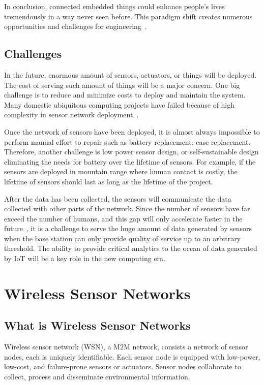 In conclusion, connected embedded things could enhance people's lives
tremendously in a way never seen before. This paradigm shift creates numerous
opportunities and challenges for engineering~\cite{Chen2012}.

\subsection{Challenges}

In the future, enormous amount of sensors, actuators, or things will be
deployed. The cost of serving such amount of things will be a major concern. One
big challenge is to reduce and minimize costs to deploy and maintain the system.
Many domestic ubiquitous computing projects have failed because of high
complexity in sensor network deployment~\cite{Beckmann2004}.

Once the network of sensors have been deployed, it is almost always impossible to
perform manual effort to repair such as battery replacement, case
replacement. Therefore, another challenge is low power sensor design, or
self-sustainable design eliminating the needs for battery over the lifetime of
sensors. For example, if the sensors are deployed in mountain range where human
contact is costly, the lifetime of sensors should last as long as the lifetime
of the project.

After the data has been collected, the sensors will communicate the data
collected with other parts of the network. Since the number of sensors have far
exceed the number of humans, and this gap will only accelerate faster in the
future~\cite{CISCO}, it is a challenge to serve the huge amount of data
generated by sensors when the base station can only provide quality of service
up to an arbitrary threshold. The ability to provide critical analytics to the
ocean of data generated by IoT will be a key role in the new computing era.

\section{Wireless Sensor Networks}

\subsection{What is Wireless Sensor Networks}

Wireless sensor network (WSN), a M2M network, consists a network of sensor
nodes, each is uniquely identifiable. Each sensor node is equipped with
low-power, low-cost, and failure-prone sensors or actuators.  Sensor nodes
collaborate to collect, process and disseminate environmental
information\cite{ArchanaBharathidasan}.


